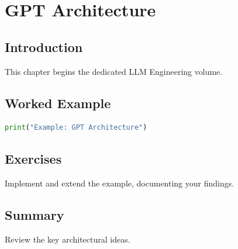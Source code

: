 \chapter{GPT Architecture}
\label{chap:vol9-2}



\section{Introduction}
This chapter begins the dedicated LLM Engineering volume.

\section{Worked Example}
\begin{lstlisting}[language=Python]
print("Example: GPT Architecture")
\end{lstlisting}

\section{Exercises}
\begin{exercise}
Implement and extend the example, documenting your findings.
\end{exercise}

\section{Summary}
Review the key architectural ideas.
